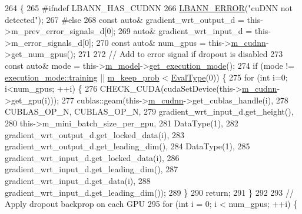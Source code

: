 \begin{DoxyCode}
264                         \{
265 \textcolor{preprocessor}{  #ifndef LBANN\_HAS\_CUDNN}
266     \hyperlink{base_8hpp_a80b1d707117e968a6951b7222e4b2b87}{LBANN\_ERROR}(\textcolor{stringliteral}{"cuDNN not detected"});
267 \textcolor{preprocessor}{  #else }
268     \textcolor{keyword}{const} \textcolor{keyword}{auto}& gradient\_wrt\_output\_d = this->m\_prev\_error\_signals\_d[0];
269     \textcolor{keyword}{auto}& gradient\_wrt\_input\_d = this->m\_error\_signals\_d[0];
270     \textcolor{keyword}{const} \textcolor{keyword}{auto}& num\_gpus = this->\hyperlink{classlbann_1_1Layer_a08dbb94239e3b8c96329786c57c72e21}{m\_cudnn}->get\_num\_gpus();
271 
272     \textcolor{comment}{// Add to error signal if dropout is disabled}
273     \textcolor{keyword}{const} \textcolor{keyword}{auto}& mode = this->\hyperlink{classlbann_1_1Layer_a3d9315e99574166f2f33e37b572021d2}{m\_model}->\hyperlink{classlbann_1_1model_addb40597cf29aa6d31b6a7d09ef48608}{get\_execution\_mode}();
274     \textcolor{keywordflow}{if} (mode != \hyperlink{base_8hpp_a2781a159088df64ed7d47cc91c4dc0a8ac185ddac8b5a8f5aa23c5b80bc12d214}{execution\_mode::training} || \hyperlink{classlbann_1_1dropout_aa06cbee70f3426b589990889b8ac8872}{m\_keep\_prob} < 
      \hyperlink{base_8hpp_a3266f5ac18504bbadea983c109566867}{EvalType}(0)) \{
275       \textcolor{keywordflow}{for} (\textcolor{keywordtype}{int} i=0; i<num\_gpus; ++i) \{
276         CHECK\_CUDA(cudaSetDevice(this->\hyperlink{classlbann_1_1Layer_a08dbb94239e3b8c96329786c57c72e21}{m\_cudnn}->get\_gpu(i)));
277         cublas::geam(this->\hyperlink{classlbann_1_1Layer_a08dbb94239e3b8c96329786c57c72e21}{m\_cudnn}->get\_cublas\_handle(i),
278                      CUBLAS\_OP\_N, CUBLAS\_OP\_N,
279                      gradient\_wrt\_input\_d.get\_height(),
280                      this->m\_mini\_batch\_size\_per\_gpu,
281                      DataType(1),
282                      gradient\_wrt\_output\_d.get\_locked\_data(i),
283                      gradient\_wrt\_output\_d.get\_leading\_dim(),
284                      DataType(1),
285                      gradient\_wrt\_input\_d.get\_locked\_data(i),
286                      gradient\_wrt\_input\_d.get\_leading\_dim(),
287                      gradient\_wrt\_input\_d.get\_data(i),
288                      gradient\_wrt\_input\_d.get\_leading\_dim());
289       \}
290       \textcolor{keywordflow}{return};
291     \}
292 
293     \textcolor{comment}{// Apply dropout backprop on each GPU}
295 \textcolor{comment}{}    \textcolor{keywordflow}{for} (\textcolor{keywordtype}{int} i = 0; i < num\_gpus; ++i) \{

\end{DoxyCode}
